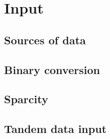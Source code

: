\chapter{Input}
\section{Sources of data}

\section{Binary conversion}

\section{Sparcity}

\section{Tandem data input}
